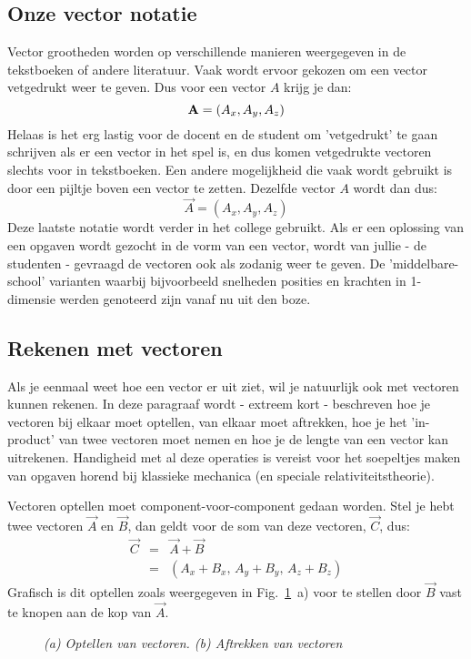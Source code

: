 \subsection{Onze vector notatie}

Vector grootheden worden op verschillende manieren weergegeven in de tekstboeken of
andere literatuur. Vaak wordt ervoor gekozen om een vector vetgedrukt weer te geven. Dus
voor een vector $A$ krijg je dan:
\begin{equation}
{\bf A} = (A_x, A_y, A_z)
\end{equation}
Helaas is het erg lastig voor de docent en de student om 'vetgedrukt' te gaan schrijven als er een vector in het spel is, en dus komen vetgedrukte vectoren slechts voor in tekstboeken.
Een andere mogelijkheid die vaak wordt gebruikt is door een pijltje boven een vector te zetten.
Dezelfde vector $A$ wordt dan dus:
\begin{equation}
\vec{A}=(A_x, A_y, A_z)
\end{equation}
Deze laatste notatie wordt verder in het college gebruikt. Als er een oplossing van een
opgaven wordt gezocht in de vorm van een vector, wordt van jullie - de studenten - gevraagd
de vectoren ook als zodanig weer te geven.  De 'middelbare-school' varianten waarbij bijvoorbeeld snelheden posities en krachten in 1-dimensie werden genoteerd zijn vanaf nu uit den boze.

\subsection{Rekenen met vectoren}\label{sec:vectorcalculus}

Als je eenmaal weet hoe een vector er uit ziet, wil je natuurlijk ook met vectoren kunnen
rekenen. In deze paragraaf wordt - extreem kort - beschreven hoe je vectoren bij elkaar
moet optellen, van elkaar moet aftrekken, hoe je het 'in-product' van twee vectoren moet
nemen en hoe je de lengte van een vector kan uitrekenen. Handigheid met al deze 
operaties is vereist voor het soepeltjes maken van opgaven horend bij klassieke mechanica
(en speciale relativiteitstheorie).

Vectoren optellen moet component-voor-component gedaan 
worden. Stel je hebt twee vectoren $\vec{A}$ en $\vec{B}$, dan geldt voor de som van deze 
vectoren, $\vec{C}$, dus:
\begin{eqnarray}
\vec{C} & = & \vec{A} + \vec{B} \\
              & = & (A_x + B_x,\, A_y + B_y, \,A_z + B_z) 
\end{eqnarray}
Grafisch is dit optellen zoals weergegeven in Fig.~\ref{fig:vecop}~a) voor te stellen door $\vec{B}$
vast te knopen aan de kop van $\vec{A}$. 
\begin{figure}[htbp]
\begin{center}
\caption{{\it (a) Optellen van vectoren. (b) Aftrekken van vectoren }}
\label{fig:vecop}
\end{center}
\end{figure}


